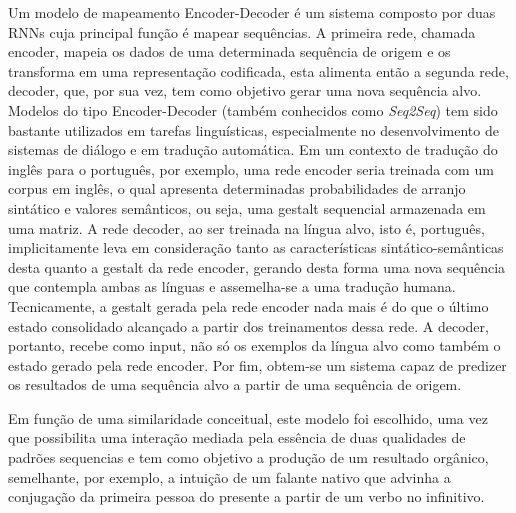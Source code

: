 Um modelo de mapeamento Encoder-Decoder é um sistema composto por duas RNNs cuja principal função é mapear sequências. A primeira rede, chamada encoder, mapeia os dados de uma determinada sequência de origem e os transforma em uma representação codificada, esta alimenta então a segunda rede, decoder, que, por sua vez, tem como objetivo gerar uma nova sequência alvo.  %
Modelos do tipo Encoder-Decoder (também conhecidos como \textit{Seq2Seq}) tem sido bastante utilizados em tarefas linguísticas, especialmente no desenvolvimento de sistemas de diálogo e em tradução automática. Em um contexto de tradução do inglês para o português, por exemplo, uma rede encoder seria treinada com um corpus em inglês, o qual apresenta determinadas probabilidades de arranjo sintático e valores semânticos, ou seja, uma gestalt sequencial armazenada em uma matriz. A rede decoder, ao ser treinada na língua alvo, isto é, português, implicitamente leva em consideração tanto as características sintático-semânticas desta quanto a gestalt da rede encoder, gerando desta forma uma nova sequência que contempla ambas as línguas e assemelha-se a uma tradução humana. Tecnicamente, a gestalt gerada pela rede encoder nada mais é do que o último estado consolidado alcançado a partir dos treinamentos dessa rede. A decoder, portanto, recebe como input, não só os exemplos da língua alvo como também o estado gerado pela rede encoder. Por fim, obtem-se um sistema capaz de predizer os resultados de uma sequência alvo a partir de uma sequência de origem.

Em função de uma similaridade conceitual, este modelo foi escolhido, uma vez que possibilita uma interação mediada pela essência de duas qualidades de padrões sequencias e tem como objetivo a produção de um resultado orgânico, semelhante, por exemplo, a intuição de um falante nativo que advinha a conjugação da primeira pessoa do presente a partir de um verbo no infinitivo. 





